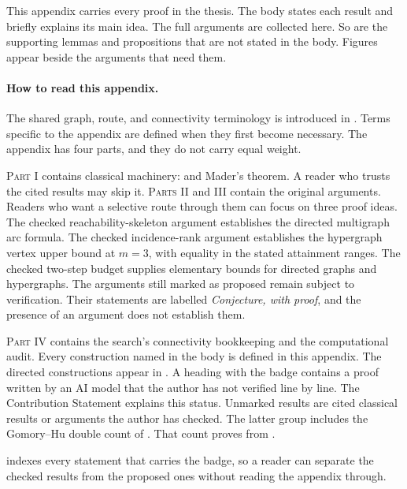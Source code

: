 This appendix carries every proof in the thesis. The body states each result
and briefly explains its main idea. The full arguments are collected here.
So are the supporting lemmas and propositions that are not stated in the
body. Figures appear beside the arguments that need them.

\paragraph{How to read this appendix.}
The shared graph, route, and connectivity terminology is introduced in .
Terms specific to the appendix are defined when they first become necessary.
The appendix has four parts, and they do not carry equal weight.

\textsc{Part I} contains classical machinery:  and Mader's theorem.
A reader who trusts the cited results may skip it.
\textsc{Parts II} and \textsc{III} contain the original arguments.
Readers who want a selective route through them can focus on three proof ideas.
The checked reachability-skeleton argument establishes the directed multigraph arc formula.
The checked incidence-rank argument establishes the hypergraph vertex upper bound at $m=3$, with equality in the stated attainment ranges.
The checked two-step budget supplies elementary bounds for directed graphs and hypergraphs.
The arguments still marked as proposed remain subject to verification. Their statements are labelled
\emph{Conjecture, with proof}, and the presence of an argument does not establish them.

\textsc{Part IV} contains the search's connectivity bookkeeping and the computational audit.
Every construction named in the body is defined in this appendix.
The directed constructions appear in .
A heading with the badge \aimedal{} contains a proof written by an AI model that the author has not verified line by line.
The Contribution Statement explains this status.
Unmarked results are cited classical results or arguments the author has checked.
The latter group includes the Gomory--Hu double count of .
That count proves  from .

 indexes every statement that carries the badge, so
a reader can separate the checked results from the proposed ones without
reading the appendix through.

\begin{table}[htbp]
\centering\small
\renewcommand{\arraystretch}{1.2}

\caption{Index of the statements whose proofs are proposed rather than checked.
Each is stated as \emph{Conjecture, with proof} and carries \aimedal{} in its
heading. The proposed arguments are retained as research notes and do not
establish these statements. Some entries are dependencies of others: for
instance  are the two steps of
.}
\label{tab:conjecture-index}
\end{table}

